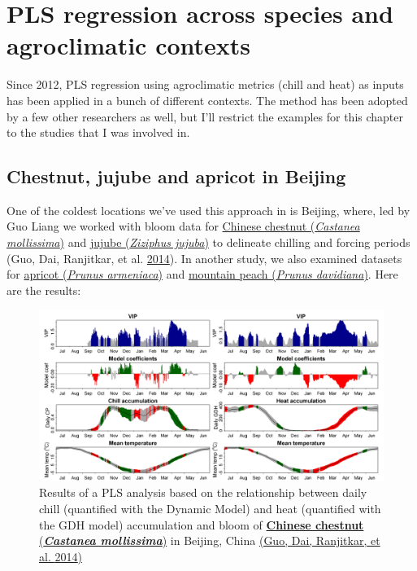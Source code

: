 \documentclass[
]{book}
\begin{document}
\hypertarget{pls-regression-across-species-and-agroclimatic-contexts}{%
\section{PLS regression across species and agroclimatic contexts}\label{pls-regression-across-species-and-agroclimatic-contexts}}

Since 2012, PLS regression using agroclimatic metrics (chill and heat) as inputs has been applied in a bunch of different contexts. The method has been adopted by a few other researchers as well, but I'll restrict the examples for this chapter to the studies that I was involved in.

\hypertarget{chestnut-jujube-and-apricot-in-beijing}{%
\subsection{Chestnut, jujube and apricot in Beijing}\label{chestnut-jujube-and-apricot-in-beijing}}

One of the coldest locations we've used this approach in is Beijing, where, led by Guo Liang we worked with bloom data for \href{https://en.wikipedia.org/wiki/Castanea_mollissima}{Chinese chestnut (\emph{Castanea mollissima})} and \href{https://en.wikipedia.org/wiki/Jujube}{jujube (\emph{Ziziphus jujuba})} to delineate chilling and forcing periods (Guo, Dai, Ranjitkar, et al. \protect\hyperlink{ref-guo2014chilling}{2014}). In another study, we also examined datasets for \href{https://en.wikipedia.org/wiki/Prunus_armeniaca}{apricot (\emph{Prunus armeniaca})} and \href{https://en.wikipedia.org/wiki/Prunus_davidiana}{mountain peach (\emph{Prunus davidiana})}. Here are the results:

\begin{figure}
\centering
\includegraphics{pictures/PLS_chill_force_chestnut.png}
\caption{Results of a PLS analysis based on the relationship between daily chill (quantified with the Dynamic Model) and heat (quantified with the GDH model) accumulation and bloom of \href{https://en.wikipedia.org/wiki/Castanea_mollissima}{\textbf{Chinese chestnut} (\textbf{\emph{Castanea mollissima}})} in Beijing, China \href{https://link.springer.com/article/10.1007/s00484-013-0714-3}{(Guo, Dai, Ranjitkar, et al. \protect\hyperlink{ref-guo2014chilling}{2014})}}
\end{figure}
\end{document}
